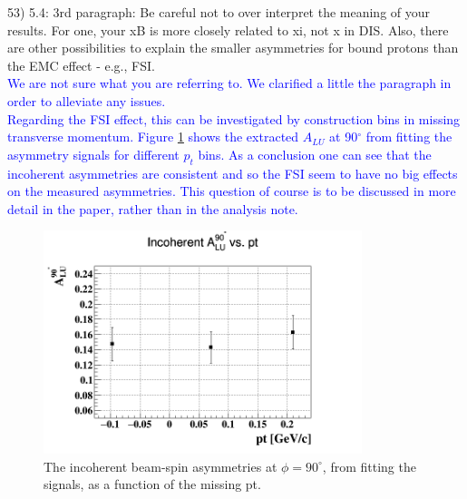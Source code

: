 53) 5.4: 3rd paragraph: Be careful not to over interpret the meaning of your 
results. For one, your xB is more closely related to xi, not x in DIS. Also, 
there are other possibilities to explain the smaller asymmetries for bound 
protons than the EMC effect - e.g., FSI. \\
\textcolor{blue}{We are not sure what you are referring to. We clarified a 
little the paragraph in order to alleviate any issues.} \\
\textcolor{blue}{Regarding the FSI effect, this can be investigated by 
construction bins in missing transverse momentum. Figure 
\ref{fig:alu_alpha_bins_pt} shows the extracted $A_{LU}$ at 90$^{\circ}$ from 
fitting the asymmetry signals for different $p_t$ bins. As a conclusion one 
can see that the incoherent asymmetries are consistent and so the FSI seem to 
have no big effects on the measured asymmetries. This question of course is to 
be discussed in more detail in the paper, rather than in the analysis note.}\\



 \begin{figure}[tbp]
  \centering
  \includegraphics[height=6.5cm]{fig/incoh_PT_alpha.png}
  \caption{The incoherent beam-spin asymmetries at $\phi = 90 ^{\circ}$, from 
  fitting the signals, as a function of the missing pt.}
  \label{fig:alu_alpha_bins_pt}
 \end{figure}

